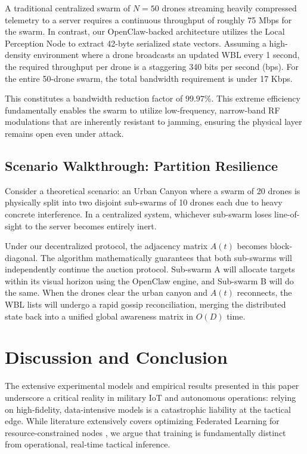 A traditional centralized swarm of $N=50$ drones streaming heavily compressed telemetry to a server requires a continuous throughput of roughly 75 Mbps for the swarm. In contrast, our OpenClaw-backed architecture utilizes the Local Perception Node to extract 42-byte serialized state vectors. Assuming a high-density environment where a drone broadcasts an updated WBL every 1 second, the required throughput per drone is a staggering 340 bits per second (bps). For the entire 50-drone swarm, the total bandwidth requirement is under 17 Kbps. 

This constitutes a bandwidth reduction factor of $99.97\%$. This extreme efficiency fundamentally enables the swarm to utilize low-frequency, narrow-band RF modulations that are inherently resistant to jamming, ensuring the physical layer remains open even under attack.

\subsection{Scenario Walkthrough: Partition Resilience}
Consider a theoretical scenario: an Urban Canyon where a swarm of 20 drones is physically split into two disjoint sub-swarms of 10 drones each due to heavy concrete interference. In a centralized system, whichever sub-swarm loses line-of-sight to the server becomes entirely inert. 

Under our decentralized protocol, the adjacency matrix $A(t)$ becomes block-diagonal. The algorithm mathematically guarantees that both sub-swarms will independently continue the auction protocol. Sub-swarm A will allocate targets within its visual horizon using the OpenClaw engine, and Sub-swarm B will do the same. When the drones clear the urban canyon and $A(t)$ reconnects, the WBL lists will undergo a rapid gossip reconciliation, merging the distributed state back into a unified global awareness matrix in $O(D)$ time.

\section{Discussion and Conclusion}

The extensive experimental models and empirical results presented in this paper underscore a critical reality in military IoT and autonomous operations: relying on high-fidelity, data-intensive models is a catastrophic liability at the tactical edge. While literature extensively covers optimizing Federated Learning for resource-constrained nodes \cite{imteaj2022, junior2025}, we argue that training is fundamentally distinct from operational, real-time tactical inference.

